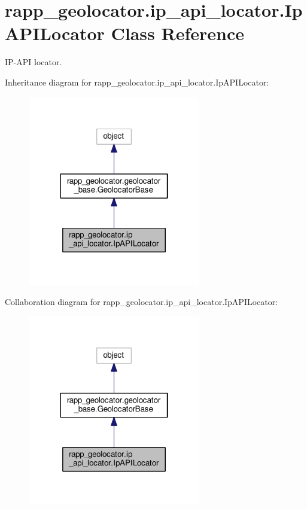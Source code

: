 \hypertarget{classrapp__geolocator_1_1ip__api__locator_1_1IpAPILocator}{\section{rapp\-\_\-geolocator.\-ip\-\_\-api\-\_\-locator.\-Ip\-A\-P\-I\-Locator Class Reference}
\label{classrapp__geolocator_1_1ip__api__locator_1_1IpAPILocator}
}


I\-P-\/\-A\-P\-I locator.  




Inheritance diagram for rapp\-\_\-geolocator.\-ip\-\_\-api\-\_\-locator.\-Ip\-A\-P\-I\-Locator\-:
\nopagebreak
\begin{figure}[H]
\begin{center}
\leavevmode
\includegraphics[width=214pt]{classrapp__geolocator_1_1ip__api__locator_1_1IpAPILocator__inherit__graph}
\end{center}
\end{figure}


Collaboration diagram for rapp\-\_\-geolocator.\-ip\-\_\-api\-\_\-locator.\-Ip\-A\-P\-I\-Locator\-:
\nopagebreak
\begin{figure}[H]
\begin{center}
\leavevmode
\includegraphics[width=214pt]{classrapp__geolocator_1_1ip__api__locator_1_1IpAPILocator__coll__graph}
\end{center}
\end{figure}
